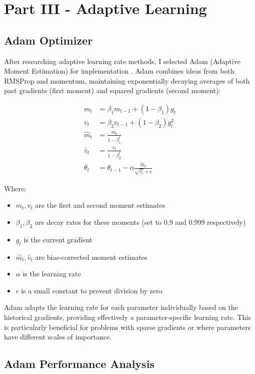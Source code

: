 \documentclass{article}
\begin{document}
\section{Part III - Adaptive Learning}

\subsection{Adam Optimizer}

After researching adaptive learning rate methods, I selected Adam (Adaptive Moment Estimation) for implementation \cite{kingma2014adam}. Adam combines ideas from both RMSProp and momentum, maintaining exponentially decaying averages of both past gradients (first moment) and squared gradients (second moment):

\begin{align}
m_t &= \beta_1 m_{t-1} + (1-\beta_1)g_t \\
v_t &= \beta_2 v_{t-1} + (1-\beta_2)g_t^2 \\
\hat{m}_t &= \frac{m_t}{1-\beta_1^t} \\
\hat{v}_t &= \frac{v_t}{1-\beta_2^t} \\
\theta_t &= \theta_{t-1} - \alpha\frac{\hat{m}_t}{\sqrt{\hat{v}_t} + \epsilon}
\end{align}

\noindent Where:

\begin{itemize}
    \item $m_t, v_t$ are the first and second moment estimates
    \item $\beta_1, \beta_2$ are decay rates for these moments (set to 0.9 and 0.999 respectively)
    \item $g_t$ is the current gradient
    \item $\hat{m}_t, \hat{v}_t$ are bias-corrected moment estimates
    \item $\alpha$ is the learning rate
    \item $\epsilon$ is a small constant to prevent division by zero
\end{itemize}

Adam adapts the learning rate for each parameter individually based on the historical gradients, 
providing effectively a parameter-specific learning rate. This is particularly beneficial for 
problems with sparse gradients or where parameters have different scales of importance.

\subsection{Adam Performance Analysis}
\end{document}
